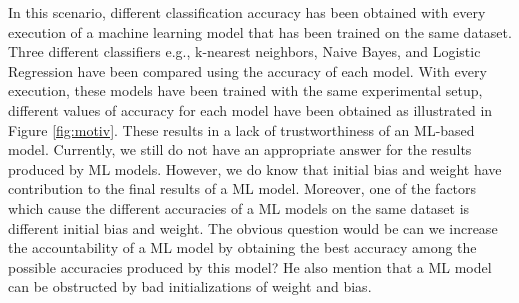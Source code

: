 In this scenario, different classification accuracy has been obtained with every execution of a machine learning model that has been trained on the same dataset. Three different classifiers e.g., k-nearest neighbors, Naive Bayes, and Logistic Regression have been compared using the accuracy of each model. With every execution, these models have been trained with the same experimental setup, different values of accuracy for each model have been obtained as illustrated in Figure \ref{fig:motiv}. These results in a lack of trustworthiness of an ML-based model. Currently, we still do not have an appropriate answer for the results produced by ML models. However, we do know that initial bias and weight have contribution to the final results of a ML model. Moreover, one of the factors which cause the different accuracies of a ML models on the same dataset is different initial bias and weight. The obvious question would be can we increase the accountability of a ML model by obtaining the best accuracy among the possible accuracies produced by this model? He\etal \cite{he2015delving} also mention that a ML model can be obstructed by bad initializations of weight and bias. 

